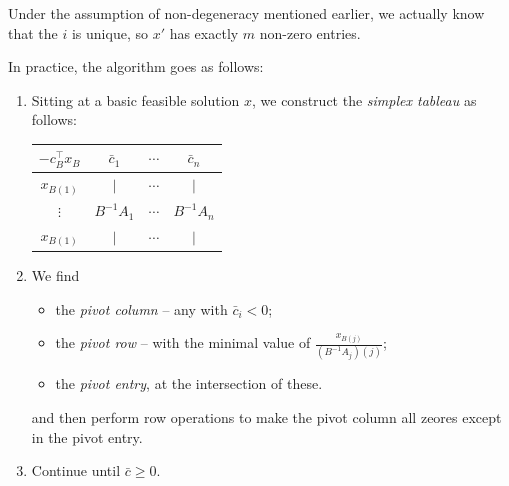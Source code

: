 \documentclass{../../template/note}
\begin{document}
    \begin{remark*}
        Under the assumption of non-degeneracy mentioned earlier, we actually know that the $i$ is unique, so $x'$ has exactly $m$ non-zero entries.
    \end{remark*}
    
    In practice, the algorithm goes as follows:
    
    \begin{algorithm}
        \begin{enumerate}[label=\protect\circled{\arabic*}]
            \item Sitting at a basic feasible solution $x$, we construct the \emph{simplex tableau} as follows:
            \begin{center}    
                \begin{tabular}{| c | c c c |}
                    \hline
                    $-c_B^\intercal x_B$ & $\bar c_1$ & $\cdots$ & $\bar c_n$ \\
                    \hline
                    $x_{B(1)}$ & $\mid$ & $\cdots$ & $\mid$ \\
                    $\vdots$ & $B^{-1}A_1$ & $\cdots$ & $B^{-1}A_n$ \\
                    $x_{B(1)}$ & $\mid$ & $\cdots$ & $\mid$ \\
                    \hline
                \end{tabular}        
            \end{center}
            \item We find
            \begin{itemize}
                \item the \emph{pivot column} -- any with $\bar c_i < 0$;
                \item the \emph{pivot row} -- with the minimal value of $\frac{x_{B(j)}}{(B^{-1}A_j)(j)}$;
                \item the \emph{pivot entry}, at the intersection of these.
            \end{itemize}
            and then perform row operations to make the pivot column all zeores except in the pivot entry.
            \item Continue until $\bar c \geq 0$.       
        \end{enumerate}       
    \end{algorithm}
    
\end{document}
